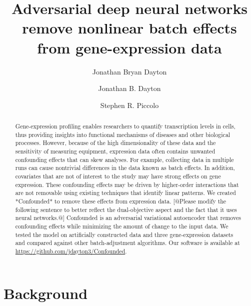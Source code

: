 \documentclass[11pt]{article}
\begin{document}
\title{Adversarial deep neural networks remove nonlinear batch effects from gene-expression data}
\author{Jonathan Bryan Dayton}
\author[1]{Jonathan B. Dayton}
\author[1]{Stephen R. Piccolo}

\maketitle

\begin{abstract}
	Gene-expression profiling enables researchers to quantify transcription levels in cells, thus providing insights into functional mechanisms of diseases and other biological processes.
	However, because of the high dimensionality of these data and the sensitivity of measuring equipment, expression data often contains unwanted confounding effects that can skew analyses.
	For example, collecting data in multiple runs can cause nontrivial differences in the data known as batch effects.
	In addition, covariates that are not of interest to the study may have strong effects on gene expression.
	These confounding effects may be driven by higher-order interactions that are not removable using existing techniques that identify linear patterns.
	We created *Confounded* to remove these effects from expression data.
	[@Please modify the following sentence to better reflect the dual-objective aspect and the fact that it uses neural networks.@] %
	Confounded is an adversarial variational autoencoder that removes confounding effects while minimizing the amount of change to the input data.
	We tested the model on artificially constructed data and three gene-expression datasets and compared against other batch-adjustment algorithms.
	Our software is available at \url{https://github.com/jdayton3/Confounded}.
\end{abstract}

\doublespacing
\section{Background} \label{sec:background}
\end{document}
